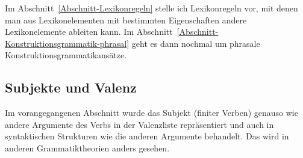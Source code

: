 Im Abschnitt~\ref{Abschnitt-Lexikonregeln} stelle ich Lexikonregeln vor, mit denen man aus Lexikonelementen
mit bestimmten Eigenschaften andere Lexikonelemente ableiten kann. Im
Abschnitt~\ref{Abschnitt-Konstruktionsgrammatik-phrasal} geht es dann nochmal um phrasale Konstruktionsgrammatikansätze.

\subsection{Subjekte und Valenz}
\label{sec-Subjekt-und-Valenz}

Im vorangegangenen Abschnitt wurde das Subjekt (finiter Verben) genauso wie andere Argumente des Verbs
in der Valenzliste repräsentiert und auch in syntaktischen Strukturen wie die anderen
Argumente behandelt. Das wird in anderen Grammatiktheorien anders gesehen.

